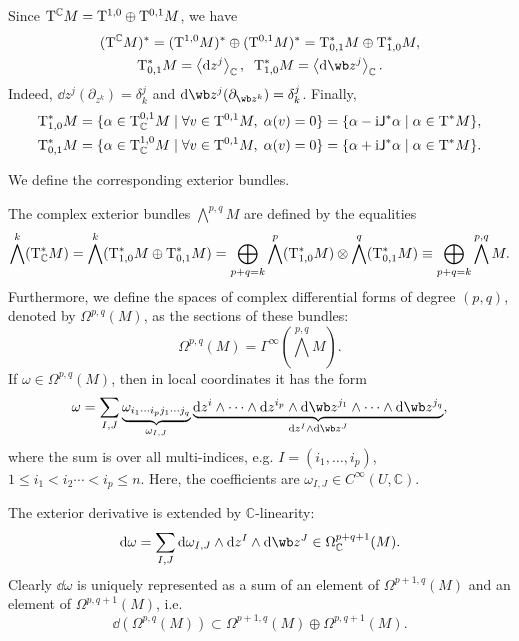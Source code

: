 Since $\mathrm{T}^\mathbb{C}M=\mathrm{T}^{1,0}\oplus \mathrm{T}^{0,1}M$, we have
\begin{gather}
    (\T^\mathbb{C}M)^\ast=(\T^{1,0}M)^\ast \oplus (\T^{0,1}M)^\ast=\T^\ast_{0,1}M\oplus \T^\ast_{1,0}M,\\ \T^\ast_{0,1}M=\<\dd z^j\>_\bbC,\;\; \T^\ast_{1,0}M=\<\dd\wb z^j\>_\bbC.
\end{gather}
Indeed, $\dd z^j(\partial_{z^k})=\delta^j_k$ and $\dd \wb z^j (\partial_{\wb z^k})=\delta^j_k$.
Finally, 
\begin{align}
    \mathrm{T}^\ast_{1,0}M=\{\alpha\in \mathrm{T}^{0,1}_{\mathbb{C}}M\mid \forall v\in \mathrm{T}^{0,1}M,\; \alpha(v)=0\}=\{\alpha-\mathrm{i}\mathsf{J}^\ast\alpha\mid \alpha\in \mathrm{T}^\ast M\},\\
    \mathrm{T}^\ast_{0,1}M=\{\alpha\in \mathrm{T}^{1,0}_{\mathbb{C}}M\mid \forall v\in \mathrm{T}^{0,1}M,\; \alpha(v)=0\}=\{\alpha+\mathrm{i}\mathsf{J}^\ast\alpha\mid \alpha\in \mathrm{T}^\ast M\}.
\end{align}

We define the corresponding exterior bundles.

\begin{defn}
    The complex exterior bundles $\bigwedge^{p,q}M$ are defined by the equalities \[\bigwedge^k(\mathrm{T}^\ast_\mathbb{C}M)=\bigwedge^k(\mathrm{T}^\ast_{1,0}M\oplus \mathrm{T}^\ast_{0,1}M)=\bigoplus_{p+q=k}\bigwedge^p(\mathrm{T}^\ast_{1,0}M)\otimes \bigwedge^q(\mathrm{T}^\ast_{0,1}M)\equiv \bigoplus_{p+q=k}\bigwedge^{p,q}M.\]
    Furthermore, we define the spaces of complex differential forms of degree $(p,q)$, denoted by $\Omega^{p,q}(M)$, as the sections of these bundles:
    \[\Omega^{p,q}(M)=\Gamma^\infty(\bigwedge^{p,q}M).\]
    If $\omega\in\Omega^{p,q}(M)$, then in local coordinates it has the form
    \[\omega=\sum_{I,J}\underbrace{\omega_{i_1\cdots i_pj_1\cdots j_q}}_{\omega_{I,J}}\underbrace{\dd z^i\wedge\cdots\wedge \dd z^{i_p}\wedge\dd \wb z^{j_1}\wedge\cdots\wedge \dd\wb z^{j_q}}_{\dd z^I\wedge \dd\wb z^J},\]
    where the sum is over all multi-indices, e.g. $I=(i_1,\ldots,i_p)$, $1\leq i_1<i_2\cdots<i_p\leq n$. Here, the coefficients are $\omega_{I,J}\in C^\infty (U,\mathbb{C})$.
\end{defn}

 The exterior derivative is extended by $\mathbb{C}$-linearity:
    \[\dd \omega=\sum_{I,J}\dd\omega_{I,J}\wedge\dd z^I\wedge\dd \wb z^J\in\Omega^{p+q+1}_\mathbb{C}(M).\]
Clearly $\dd\omega$ is uniquely represented as a sum of an element of $\Omega^{p+1,q}(M)$ and an element of $\Omega^{p,q+1}(M)$, i.e.
\[\dd(\Omega^{p,q}(M))\subset \Omega^{p+1,q}(M)\oplus\Omega^{p,q+1}(M).\]

